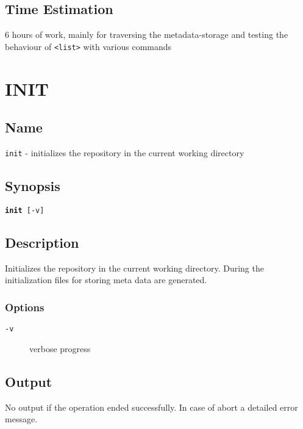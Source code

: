 \documentclass{article} %
\begin{document}
				\subsection*{Time Estimation}
				6 hours of work, mainly for traversing the metadata-storage and testing the behaviour of \texttt{<list>} with various commands \\
				\noindent
		\newpage
		
		\section*{INIT}
		\subsection*{Name}
		\texttt{init} - initializes the repository in the current working directory
		\subsection*{Synopsis}
		\texttt{\textbf{init} [-v]}
		\subsection*{Description}
		Initializes the repository in the current working directory.
		During the initialization files for storing meta data are generated.\\
		
		\noindent
		\subsubsection*{Options}
		\begin{description}
			\item[\texttt{-v}] verbose progress
		\end{description}
		
		\subsection*{Output}
		No output if the operation ended successfully. In case of abort a detailed error message.
\end{document}
